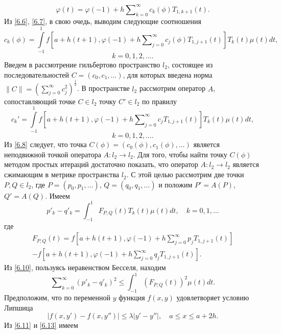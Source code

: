 \begin{equation}\label{6.7}
\varphi(t)= \varphi(-1)+ h\sum\nolimits_{k=0}^\infty c_k(\phi)T_{1,k+1}(t).
\end{equation}
Из  \eqref{6.6}, \eqref{6.7}, в свою очедь, выводим следующие соотношения
\begin{equation}\label{6.8}
c_k(\phi)=\int\limits_{-1}^1f\left[a+h(t+1),\varphi(-1)+ h\sum\nolimits_{j=0}^\infty c_j(\phi)T_{1,j+1}(t)\right]T_k(t) \mu(t)dt,
\end{equation}
$$
k=0,1,2,\ldots.
$$
Введем в рассмотрение гильбертово пространство $l_2$, состоящее из последовательностей $C=(c_0,c_1,\ldots)$, для которых введена норма
$\|C\|=\left(\sum_{j=0}^\infty c_j^2\right)^\frac12$.  В пространстве $l_2$ рассмотрим оператор $A$, сопоставляющий точке $C\in l_2$ точку $C'\in l_2$ по правилу
\begin{equation}\label{6.9}
c_k'=\int\limits_{-1}^1f\left[a+h(t+1),\varphi(-1)+ h\sum\nolimits_{j=0}^\infty c_jT_{1,j+1}(t)\right]T_k(t) \mu(t)dt,
\end{equation}
$$
k=0,1,2,\ldots.
$$
Из  \eqref{6.8} следует, что точка $C(\phi)=(c_0(\phi),c_1(\phi),\ldots)$ является неподвижной точкой оператора $A:l_2\to l_2$. Для того, чтобы найти точку $C(\phi)$ методом простых итераций достаточно показать, что оператор $A:l_2\to l_2$ является сжимающим в метрике пространства $l_2$. С этой целью рассмотрим две точки $P,Q\in l_2$, где $P=(p_0,p_1,\ldots)$, $Q=(q_0,q_1,\ldots)$ и положим $P'=A(P)$, $Q'=A(Q)$. Имеем
\begin{equation}\label{6.10}
p'_k-q'_k=\int_{-1}^1F_{P,Q}(t)T_k(t) \mu(t)dt,\quad k=0,1,\ldots
\end{equation}
где
\begin{multline}\label{6.11}
 F_{P,Q}(t)=f\left[a+h(t+1),\varphi(-1)+ h\sum\nolimits_{j=0}^\infty p_jT_{1,j+1}(t)\right] \\
  -f\left[a+h(t+1),\varphi(-1)+ h\sum\nolimits_{j=0}^\infty q_jT_{1,j+1}(t)\right].
\end{multline}
Из \eqref{6.10}, пользуясь неравенством Бесселя, находим
 \begin{equation}\label{6.12}
\sum\nolimits_{k=0}^\infty (p'_k-q'_k)^2\le\int_{-1}^1(F_{P,Q}(t))^2 \mu(t)dt.
\end{equation}
 Предположим, что по переменной $y$ функция $f(x,y)$ удовлетворяет условию Липшица
 \begin{equation}\label{6.13}
|f(x,y')-f(x,y'')|\le \lambda|y'-y''|, \quad a\le x \le a+2h.
\end{equation}
Из \eqref{6.11} и \eqref{6.13}  имеем
